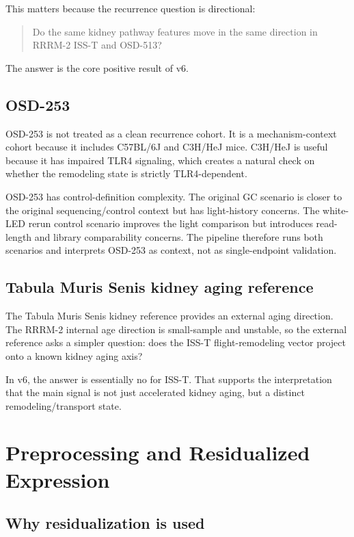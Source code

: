 \documentclass[11pt]{article}
\begin{document}
This matters because the recurrence question is directional:

\begin{quote}
Do the same kidney pathway features move in the same direction in RRRM-2 ISS-T and OSD-513?
\end{quote}

The answer is the core positive result of v6.

\subsection{OSD-253}

OSD-253 is not treated as a clean recurrence cohort. It is a mechanism-context cohort because it includes C57BL/6J and C3H/HeJ mice. C3H/HeJ is useful because it has impaired TLR4 signaling, which creates a natural check on whether the remodeling state is strictly TLR4-dependent.

OSD-253 has control-definition complexity. The original GC scenario is closer to the original sequencing/control context but has light-history concerns. The white-LED rerun control scenario improves the light comparison but introduces read-length and library comparability concerns. The pipeline therefore runs both scenarios and interprets OSD-253 as context, not as single-endpoint validation.

\subsection{Tabula Muris Senis kidney aging reference}

The Tabula Muris Senis kidney reference provides an external aging direction. The RRRM-2 internal age direction is small-sample and unstable, so the external reference asks a simpler question: does the ISS-T flight-remodeling vector project onto a known kidney aging axis?

In v6, the answer is essentially no for ISS-T. That supports the interpretation that the main signal is not just accelerated kidney aging, but a distinct remodeling/transport state.

\section{Preprocessing and Residualized Expression}

\subsection{Why residualization is used}
\end{document}
